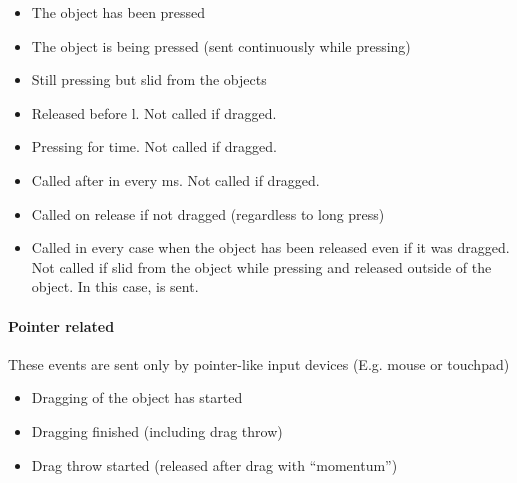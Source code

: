 \documentclass[letterpaper,10pt,english]{sphinxmanual}
\begin{document}
\begin{itemize}
\item {} 
 The object has been pressed

\item {} 
 The object is being pressed (sent continuously while pressing)

\item {} 
 Still pressing but slid from the objects

\item {} 
 Released before l. Not called if dragged.

\item {} 
  Pressing for  time.  Not called if dragged.

\item {} 
 Called after  in every  ms.  Not called if dragged.

\item {} 
 Called on release if not dragged (regardless to long press)

\item {} 
  Called in every case when the object has been released even if it was dragged. Not called if slid from the object while pressing and released outside of the object. In this case,  is sent.

\end{itemize}


\paragraph{Pointer related}
\label{\detokenize{overview/events:pointer-related}}
These events are sent only by pointer-like input devices (E.g. mouse or touchpad)
\begin{itemize}
\item {} 
 Dragging of the object has started

\item {} 
 Dragging finished (including drag throw)

\item {} 
 Drag throw started (released after drag with “momentum”)

\end{itemize}
\end{document}
